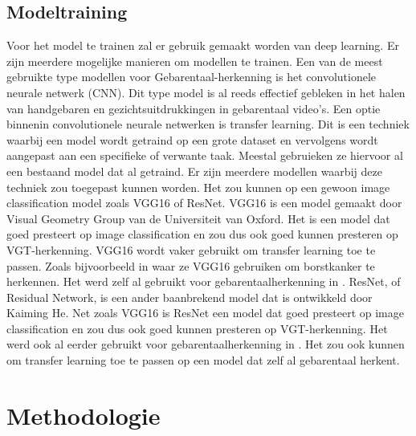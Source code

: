 \subsection{Modeltraining}
\label{subsec:modeltraining}
Voor het model te trainen zal er gebruik gemaakt worden van deep learning.
Er zijn meerdere mogelijke manieren om modellen te trainen. 
Een van de meest gebruikte type modellen voor Gebarentaal-herkenning is het convolutionele neurale netwerk (CNN).
Dit type model is al reeds effectief gebleken in het halen van handgebaren en gezichtsuitdrukkingen in gebarentaal video's\autocite{10.17485/ijst/v16i45.2583}.
Een optie binnenin convolutionele neurale netwerken is transfer learning.
Dit is een techniek waarbij een model wordt getraind op een grote dataset en vervolgens wordt aangepast aan een specifieke of verwante taak\autocite{torrey2010transfer}.
Meestal gebruieken ze hiervoor al een bestaand model dat al getraind.
Er zijn meerdere modellen waarbij deze techniek zou toegepast kunnen worden.
Het zou kunnen op een gewoon image classification model zoals VGG16 of ResNet.
VGG16 is een model gemaakt door Visual Geometry Group van de Universiteit van Oxford.
Het is een model dat goed presteert op image classification en zou dus ook goed kunnen presteren op VGT-herkenning.
VGG16 wordt vaker gebruikt om transfer learning toe te passen.
Zoals bijvoorbeeld in \textcite{9491631} waar ze VGG16 gebruiken om borstkanker te herkennen.
Het werd zelf al gebruikt voor gebarentaalherkenning in \textcite{Abu-Jamie2022-ABUCOS-2}.
ResNet, of Residual Network, is een ander baanbrekend model dat is ontwikkeld door Kaiming He.
Net zoals VGG16 is ResNet een model dat goed presteert op image classification en zou dus ook goed kunnen presteren op VGT-herkenning.
Het werd ook al eerder gebruikt voor gebarentaalherkenning in \textcite{Wang2022}.
Het zou ook kunnen om transfer learning toe te passen op een model dat zelf al gebarentaal herkent.




\section{Methodologie}%
\label{sec:methodologie}
